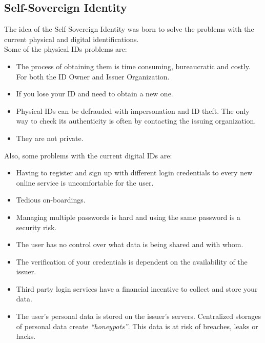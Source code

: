 \documentclass[a4paper, 12pt]{article} %
\begin{document}
        \subsection{Self-Sovereign Identity}
            The idea of the Self-Sovereign Identity was born to solve the problems with the current physical and digital identifications.\\
            Some of the physical IDs problems are:
            \begin{itemize}
                \item The process of obtaining them is time consuming, bureaucratic and costly. For both the ID Owner and Issuer Organization. 
                \item If you lose your ID and need to obtain a new one.
                \item Physical IDs can be defrauded with impersonation and ID theft. The only way to check its authenticity is often by contacting the issuing organization.
                \item They are not private.
            \end{itemize}
            Also, some problems with the current digital IDs are:
            \begin{itemize}
                \item Having to register and sign up with different login credentials to every new online service is uncomfortable for the user. 
                \item Tedious on-boardings.
                \item Managing multiple passwords is hard and using the same password is a security risk.
                \item The user has no control over what data is being shared and with whom.
                \item The verification of your credentials is dependent on the availability of the issuer.
                \item Third party login services have a financial incentive to collect and store your data.
                \item The user's personal data is stored on the issuer’s servers. Centralized storages of personal data create \textit{“honeypots”}. This data is at risk of breaches, leaks or hacks.
            \end{itemize}
\end{document}
